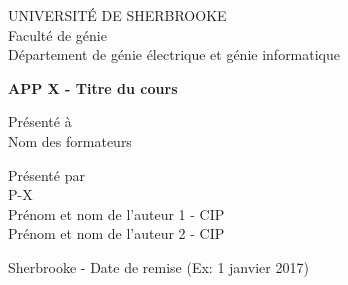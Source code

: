 {\centering
UNIVERSITÉ DE SHERBROOKE \\
Faculté de génie \\
Département de génie électrique et génie informatique \\
\vspace{30mm}

{\LARGE
\textbf{APP X - Titre du cours} \\
}
\vspace{30mm}

Présenté à \\
Nom des formateurs \\
\vspace{30mm}

Présenté par \\
P-X \\
Prénom et nom de l'auteur 1 - CIP \\
Prénom et nom de l'auteur 2 - CIP \\
\vspace{30mm}

{\large
Sherbrooke - Date de remise (Ex: 1 janvier 2017) \\
}
}
